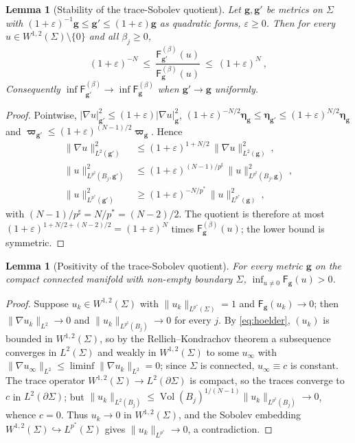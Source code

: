 \documentclass[aps,prd,reprint,amsmath,amssymb,nofootinbib,longbibliography]{revtex4-2}
\DeclareMathOperator{\Vol}{Vol}
\newcommand{\g}{\mathbf{g}}                 %
\newcommand{\vol}{\boldsymbol{\eta}}        %
\newcommand{\bvol}{\boldsymbol{\varpi}}     %
\newcommand{\pstar}{p^{*}}
\newcommand{\psharp}{p^{\sharp}}
\newcommand{\Fq}{\mathsf{F}}                %
\theoremstyle{plain}
\newtheorem{lemma}[theorem]{Lemma}
\theoremstyle{definition}
\theoremstyle{remark}
\begin{document}
\begin{lemma}[Stability of the trace-Sobolev quotient]
\label{lem:stability}
Let $\g,\g'$ be metrics on $\Sigma$ with $(1+\varepsilon)^{-1}\g\le\g'\le(1+\varepsilon)\g$ as quadratic forms, $\varepsilon\ge0$. Then for every $u\in W^{1,2}(\Sigma)\setminus\{0\}$ and all $\beta_j\ge0$,
\begin{equation*}
(1+\varepsilon)^{-N}\ \le\ \frac{\Fq^{(\beta)}_{\g'}(u)}{\Fq^{(\beta)}_{\g}(u)}\ \le\ (1+\varepsilon)^{N}\ ,
\end{equation*}
Consequently $\inf\Fq^{(\beta)}_{\g'}\to\inf\Fq^{(\beta)}_\g$ when $\g'\to\g$ uniformly.
\end{lemma}
\begin{proof}
Pointwise, $|\nabla u|^2_{\g'}\le(1+\varepsilon)|\nabla u|^2_\g$, $(1+\varepsilon)^{-N/2}\vol_\g\le\vol_{\g'}\le(1+\varepsilon)^{N/2}\vol_\g$ and $\bvol_{\g'}\le(1+\varepsilon)^{(N-1)/2}\bvol_\g$. Hence
\begin{align*}
\|\nabla u\|^2_{L^2(\g')}&\le(1+\varepsilon)^{1+N/2}\,\|\nabla u\|^2_{L^2(\g)}\ ,\\
\|u\|^2_{L^{\psharp}(B_j,\g')}&\le(1+\varepsilon)^{(N-1)/\psharp}\,\|u\|^2_{L^{\psharp}(B_j,\g)}\ ,\\
\|u\|^2_{L^{\pstar}(\g')}&\ge(1+\varepsilon)^{-N/\pstar}\,\|u\|^2_{L^{\pstar}(\g)}\ ,
\end{align*}
with $(N-1)/\psharp=N/\pstar=(N-2)/2$. The quotient is therefore at most $(1+\varepsilon)^{1+N/2+(N-2)/2}=(1+\varepsilon)^N$ times $\Fq^{(\beta)}_\g(u)$; the lower bound is symmetric.
\end{proof}

\begin{lemma}[Positivity of the trace-Sobolev quotient]
\label{lem:positivity}
For every metric $\g$ on the compact connected manifold with non-empty boundary $\Sigma$, $\inf_{u\ne0}\Fq_\g(u)>0$.
\end{lemma}
\begin{proof}
Suppose $u_k\in W^{1,2}(\Sigma)$ with $\|u_k\|_{L^{\pstar}(\Sigma)}=1$ and $\Fq_\g(u_k)\to0$; then $\|\nabla u_k\|_{L^2}\to0$ and $\|u_k\|_{L^{\psharp}(B_j)}\to0$ for every $j$. By \eqref{eq:hoelder}, $(u_k)$ is bounded in $W^{1,2}(\Sigma)$, so by the Rellich--Kondrachov theorem a subsequence converges in $L^2(\Sigma)$ and weakly in $W^{1,2}(\Sigma)$ to some $u_\infty$ with $\|\nabla u_\infty\|_{L^2}\le\liminf\|\nabla u_k\|_{L^2}=0$; since $\Sigma$ is connected, $u_\infty\equiv c$ is constant. The trace operator $W^{1,2}(\Sigma)\to L^2(\partial\Sigma)$ is compact, so the traces converge to $c$ in $L^2(\partial\Sigma)$; but $\|u_k\|_{L^2(B_j)}\le\Vol(B_j)^{1/(N-1)}\|u_k\|_{L^{\psharp}(B_j)}\to0$, whence $c=0$. Thus $u_k\to0$ in $W^{1,2}(\Sigma)$, and the Sobolev embedding $W^{1,2}(\Sigma)\hookrightarrow L^{\pstar}(\Sigma)$ \cite{Hebey1996} gives $\|u_k\|_{L^{\pstar}}\to0$, a contradiction.
\end{proof}
\end{document}
